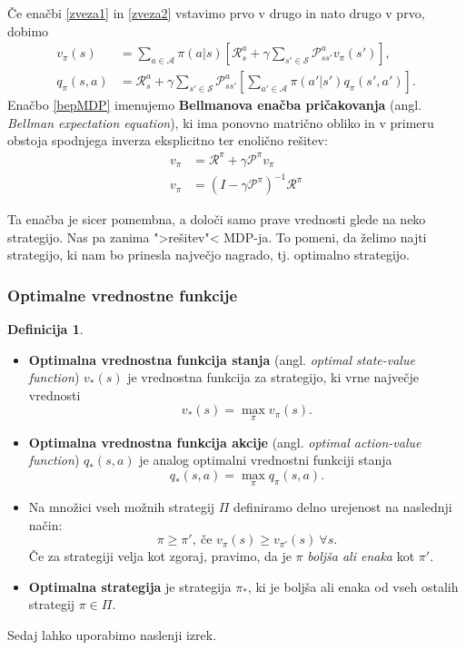 \documentclass[12pt,a4paper]{amsart}
\theoremstyle{definition} %
\newtheorem{definicija}{Definicija}[section]
\theoremstyle{plain} %
\begin{document}
Če enačbi \eqref{zveza1} in \eqref{zveza2} vstavimo prvo v drugo in nato drugo v prvo, dobimo
\begin{align}
    v_\pi(s) &= \sum_{a \in \mathcal{A}} \pi(a|s) \left[\mathcal{R}_s^a + 
    \gamma \sum_{s' \in \mathcal{S}} \mathcal{P}_{ss'}^a v_\pi(s') \right], \label{bepMDP} \\
    q_\pi(s, a) &= \mathcal{R}_s^a + \gamma \sum_{s' \in \mathcal{S}} 
    \mathcal{P}_{ss'}^a \left[\sum_{a' \in \mathcal{A}} \pi(a'|s')q_\pi(s', a') \right].
\end{align}
Enačbo \eqref{bepMDP} imenujemo \textbf{Bellmanova enačba pričakovanja} (angl. \textit{Bellman 
expectation equation}), ki ima ponovno matrično obliko in v primeru obstoja spodnjega inverza
eksplicitno ter enolično rešitev: 
\begin{align*}
    v_\pi &= \mathcal{R}^\pi + \gamma \mathcal{P}^\pi v_\pi \\
    v_\pi &= (I - \gamma \mathcal{P}^\pi)^{-1} \mathcal{R}^\pi
\end{align*}

Ta enačba je sicer pomembna, a določi samo prave vrednosti glede na neko strategijo. Nas pa zanima 
">rešitev"< MDP-ja. To pomeni, da želimo najti strategijo, ki nam bo prinesla največjo nagrado, tj. 
optimalno strategijo.

\subsubsection{Optimalne vrednostne funkcije}
\begin{definicija}
    ~
    \begin{itemize}
        \item \textbf{Optimalna vrednostna funkcija stanja} (angl. \textit{optimal state-value 
                function}) $v_*(s)$ je vrednostna funkcija za strategijo, ki vrne največje vrednosti
                $$
                v_*(s) = \max_\pi v_\pi(s).
                $$
        \item \textbf{Optimalna vrednostna funkcija akcije} (angl. \textit{optimal action-value 
                function}) $q_*(s, a)$ je analog optimalni vrednostni funkciji stanja
                $$
                q_*(s, a) = \max_\pi q_\pi(s, a).
                $$
        \item Na množici vseh možnih strategij $\Pi$ definiramo delno urejenost na naslednji način:
                $$
                \pi \geq \pi', \medspace \text{če } v_\pi(s) \geq v_{\pi'}(s) ~ \forall s. 
                $$
                Če za strategiji velja kot zgoraj, pravimo, da je $\pi$ \textit{boljša ali enaka} 
                kot $\pi'$.
        \item \textbf{Optimalna strategija} je strategija $\pi_*$, ki je boljša ali enaka od vseh 
                ostalih strategij $\pi \in \Pi$.
    \end{itemize}
\end{definicija}
Sedaj lahko uporabimo naslenji izrek.
\end{document}
